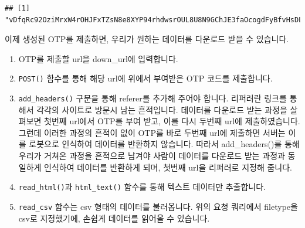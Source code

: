 \documentclass[]{book}
\newenvironment{Shaded}{\begin{snugshade}}{\end{snugshade}}
\newcommand{\DataTypeTok}[1]{\textcolor[rgb]{0.13,0.29,0.53}{#1}}
\newcommand{\KeywordTok}[1]{\textcolor[rgb]{0.13,0.29,0.53}{\textbf{#1}}}
\newcommand{\NormalTok}[1]{#1}
\newcommand{\OperatorTok}[1]{\textcolor[rgb]{0.81,0.36,0.00}{\textbf{#1}}}
\newcommand{\StringTok}[1]{\textcolor[rgb]{0.31,0.60,0.02}{#1}}
\providecommand{\tightlist}{%
  \setlength{\itemsep}{0pt}\setlength{\parskip}{0pt}}
\begin{document}
\begin{verbatim}
## [1] "vDfqRc92OziMrxW4rOHJFxTZsN8e8XYP94rhdwsrOUL8U8N9GChJE3faOcogdFyBfvHsDLoyf7fa0c2hWue9mj9IDtcym7SObBrdvwXjUAyhmbgHLoSwT5sY1JeJZ59gkpO4Yx3HUzUTba7qbJVb+tjx6AAtBwXuDgCpMTKLGjL3oUs+f5rbvpe9OkFoKwN5eefb5/Jko69v/odngDwiXT9M8bb6H0aKvBG5iduPWKjfme2CE0HFRRRD2y01Xo0o+Fnu2zI7EmpTGp8YXKinLA0KQYCKU5ilpuJJzRgBo6o="
\end{verbatim}

이제 생성된 OTP를 제출하면, 우리가 원하는 데이터를 다운로드 받을 수 있습니다.

\begin{Shaded}
\end{Shaded}

\begin{enumerate}
\def\labelenumi{\arabic{enumi}.}
\tightlist
\item
  OTP를 제출할 url을 down\_url에 입력합니다.
\item
  \texttt{POST()} 함수를 통해 해당 url에 위에서 부여받은 OTP 코드를 제출합니다.
\item
  \texttt{add\_headers()} 구문을 통해 referer를 추가해 주어야 합니다. 리퍼러란 링크를 통해서 각각의 사이트로 방문시 남는 흔적입니다. 데이터를 다운로드 받는 과정을 살펴보면 첫번째 url에서 OTP를 부여 받고, 이를 다시 두번째 url에 제출하였습니다. 그런데 이러한 과정의 흔적이 없이 OTP를 바로 두번째 url에 제출하면 서버는 이를 로봇으로 인식하여 데이터를 반환하지 않습니다. 따라서 add\_headers()를 통해 우리가 거쳐온 과정을 흔적으로 남겨야 사람이 데이터를 다운로드 받는 과정과 동일하게 인식하여 데이터를 반환하게 되며, 첫번째 url을 리퍼러로 지정해 줍니다.
\item
  \texttt{read\_html()}과 \texttt{html\_text()} 함수를 통해 텍스트 데이터만 추출합니다.
\item
  \texttt{read\_csv} 함수는 csv 형태의 데이터를 불러옵니다. 위의 요청 쿼리에서 filetype을 csv로 지정했기에, 손쉽게 데이터를 읽어올 수 있습니다.
\end{enumerate}
\end{document}
